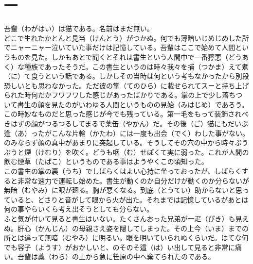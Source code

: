 \documentclass{book}
\begin{document}
\chapter*{一}
吾輩（わがはい）は猫である。名前はまだ無い。\\
どこで生れたかとんと見当（けんとう）がつかぬ。何でも薄暗いじめじめした所でニャーニャー泣いていた事だけは記憶している。吾輩はここで始めて人間というものを見た。しかもあとで聞くとそれは書生という人間中で一番獰悪（どうあく）な種族であったそうだ。この書生というのは時々我々を捕（つかま）えて煮（に）て食うという話である。しかしその当時は何という考もなかったから別段恐しいとも思わなかった。ただ彼の掌（てのひら）に載せられてスーと持ち上げられた時何だかフワフワした感じがあったばかりである。掌の上で少し落ちついて書生の顔を見たのがいわゆる人間というものの見始（みはじめ）であろう。この時妙なものだと思った感じが今でも残っている。第一毛をもって装飾されべきはずの顔がつるつるしてまるで薬缶（やかん）だ。その後（ご）猫にもだいぶ逢（あ）ったがこんな片輪（かたわ）には一度も出会（でく）わした事がない。のみならず顔の真中があまりに突起している。そうしてその穴の中から時々ぷうぷうと煙（けむり）を吹く。どうも咽（む）せぽくて実に弱った。これが人間の飲む煙草（たばこ）というものである事はようやくこの頃知った。\\
この書生の掌の裏（うち）でしばらくはよい心持に坐っておったが、しばらくすると非常な速力で運転し始めた。書生が動くのか自分だけが動くのか分らないが無暗（むやみ）に眼が廻る。胸が悪くなる。到底（とうてい）助からないと思っていると、どさりと音がして眼から火が出た。それまでは記憶しているがあとは何の事やらいくら考え出そうとしても分らない。\\
ふと気が付いて見ると書生はいない。たくさんおった兄弟が一疋（ぴき）も見えぬ。肝心（かんじん）の母親さえ姿を隠してしまった。その上今（いま）までの所とは違って無暗（むやみ）に明るい。眼を明いていられぬくらいだ。はてな何でも容子（ようす）がおかしいと、のそのそ這（は）い出して見ると非常に痛い。吾輩は藁（わら）の上から急に笹原の中へ棄てられたのである。\\
\end{document}

